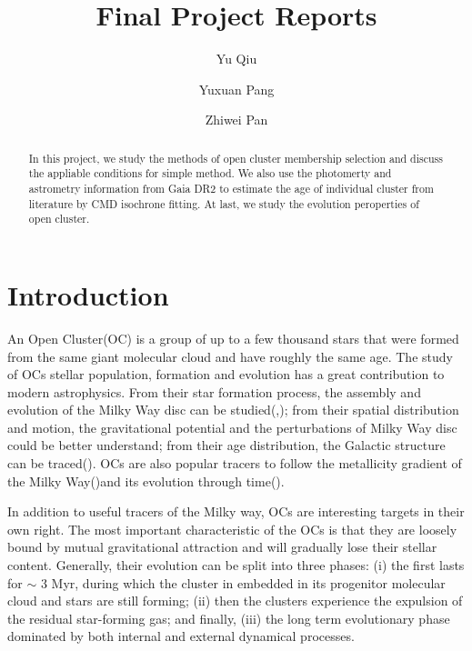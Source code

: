 \documentclass[modern]{aastex63}
\begin{document}
\title{Final Project Reports}
\author{Yu Qiu}
\author{Yuxuan Pang}
\author{Zhiwei Pan}

\begin{abstract}
In this project, we study the methods of open cluster membership selection and discuss the appliable conditions for simple method. We also use the photomerty and astrometry information from Gaia DR2 to estimate the age of individual cluster from literature by CMD isochrone fitting. At last, we study the evolution peroperties of open cluster.


\end{abstract}



\section{Introduction}\label{sec:intro}
An Open Cluster(OC) is a group of up to a few thousand stars that were formed from the same giant molecular cloud and have roughly the same age. The study of OCs stellar population, formation and evolution has a great contribution to modern astrophysics. From their star formation process, the assembly and evolution of the Milky Way disc can be studied(\cite{2016A&A...591A..37J},\cite{2016A&A...588A.120C}); from their spatial distribution and motion, the gravitational potential and the perturbations of Milky Way disc could be better understand; from their age distribution, the Galactic structure can be traced(\cite{2014MNRAS.444..290B}). OCs are also popular tracers to follow the metallicity gradient of the Milky Way(\cite{2017MNRAS.470.4363C})and its evolution through time(\cite{2016A&A...585A.150N}). 

In addition to useful tracers of the Milky way, OCs are interesting targets in their own right. The most important characteristic of the OCs is that they are loosely bound by mutual gravitational attraction and will gradually lose their stellar content. Generally, their evolution can be split into three phases: (i) the first lasts for $\sim$ 3 Myr, during which the cluster in embedded in its progenitor molecular cloud and stars are still forming; (ii) then the clusters experience the expulsion of the residual star-forming gas; and finally, (iii) the long term evolutionary phase dominated by both internal and external dynamical processes.
	
\end{document}
